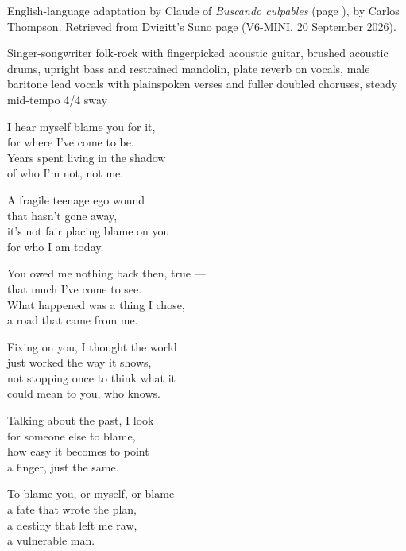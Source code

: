
\begin{notes}
English-language adaptation by Claude of \emph{Buscando culpables} (page \pageref{sec:buscando-culpables}), by Carlos Thompson. Retrieved from Dvigitt's Suno page (V6-MINI, 20 September 2026).
\end{notes}
\begin{style}
Singer-songwriter folk-rock with fingerpicked acoustic guitar, brushed acoustic drums, upright bass and restrained mandolin, plate reverb on vocals, male baritone lead vocals with plainspoken verses and fuller doubled choruses, steady mid-tempo 4/4 sway
\end{style}
\begin{lyrics}
I hear myself blame you for it,\\
for where I've come to be.\\
Years spent living in the shadow\\
of who I'm not, not me.

A fragile teenage ego wound\\
that hasn't gone away,\\
it's not fair placing blame on you\\
for who I am today.

You owed me nothing back then, true —\\
that much I've come to see.\\
What happened was a thing I chose,\\
a road that came from me.

Fixing on you, I thought the world\\
just worked the way it shows,\\
not stopping once to think what it\\
could mean to you, who knows.

Talking about the past, I look\\
for someone else to blame,\\
how easy it becomes to point\\
a finger, just the same.

To blame you, or myself, or blame\\
a fate that wrote the plan,\\
a destiny that left me raw,\\
a vulnerable man.


\end{lyrics}
